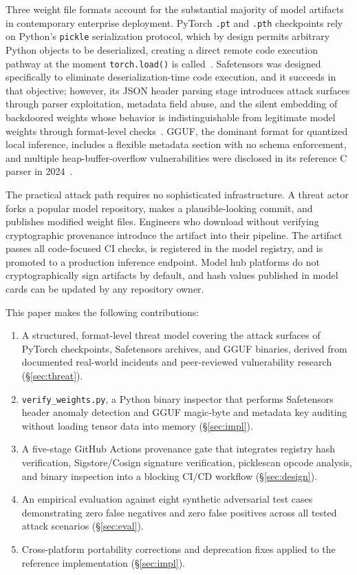 \documentclass[preprint,12pt,twocolumn]{elsarticle}
\begin{document}
Three weight file formats account for the substantial majority of model
artifacts in contemporary enterprise deployment. PyTorch \texttt{.pt} and
\texttt{.pth} checkpoints rely on Python's \texttt{pickle} serialization
protocol, which by design permits arbitrary Python objects to be
deserialized, creating a direct remote code execution pathway at the moment
\texttt{torch.load()} is called~\citep{pickleball2025}. Safetensors was
designed specifically to eliminate deserialization-time code execution, and
it succeeds in that objective; however, its JSON header parsing stage
introduces attack surfaces through parser exploitation, metadata field
abuse, and the silent embedding of backdoored weights whose behavior is
indistinguishable from legitimate model weights through format-level
checks~\citep{safetensors2025empirical}. GGUF, the dominant format for
quantized local inference, includes a flexible metadata section with no
schema enforcement, and multiple heap-buffer-overflow vulnerabilities were
disclosed in its reference C parser in 2024~\citep{gguf_quantization_attack2024}.

The practical attack path requires no sophisticated infrastructure. A
threat actor forks a popular model repository, makes a plausible-looking
commit, and publishes modified weight files. Engineers who download without
verifying cryptographic provenance introduce the artifact into their
pipeline. The artifact passes all code-focused CI checks, is registered in
the model registry, and is promoted to a production inference endpoint.
Model hub platforms do not cryptographically sign artifacts by default, and
hash values published in model cards can be updated by any repository owner.

This paper makes the following contributions:

\begin{enumerate}
  \item A structured, format-level threat model covering the attack surfaces
    of PyTorch checkpoints, Safetensors archives, and GGUF binaries, derived
    from documented real-world incidents and peer-reviewed vulnerability
    research (\S\ref{sec:threat}).
  \item \texttt{verify\_weights.py}, a Python binary inspector that
    performs Safetensors header anomaly detection and GGUF magic-byte and
    metadata key auditing without loading tensor data into memory
    (\S\ref{sec:impl}).
  \item A five-stage GitHub Actions provenance gate that integrates registry
    hash verification, Sigstore/Cosign signature verification, picklescan
    opcode analysis, and binary inspection into a blocking CI/CD workflow
    (\S\ref{sec:design}).
  \item An empirical evaluation against eight synthetic adversarial test
    cases demonstrating zero false negatives and zero false positives across
    all tested attack scenarios (\S\ref{sec:eval}).
  \item Cross-platform portability corrections and deprecation fixes applied
    to the reference implementation (\S\ref{sec:impl}).
\end{enumerate}
\end{document}
